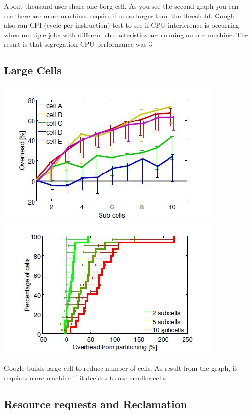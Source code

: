 \documentclass[runningheads,a4paper]{llncs}
\begin{document}
About thousand user share one borg cell. As you see the second graph you can see there are more machines require if users larger than the threshold.
Google also ran CPI (cycle per instruction) test to see if CPU interference is occurring when multiple jobs with different characteristics are running on one machine.
The result is that segregation CPU performance was 3%

\subsection{Large Cells}

\includegraphics{LargeCell1}
\includegraphics{LargeCell2}


Google builds large cell to reduce number of cells. As result from the graph, it requires more machine if it decides to use smaller cells. 


\subsection{Resource requests and Reclamation}
\end{document}
